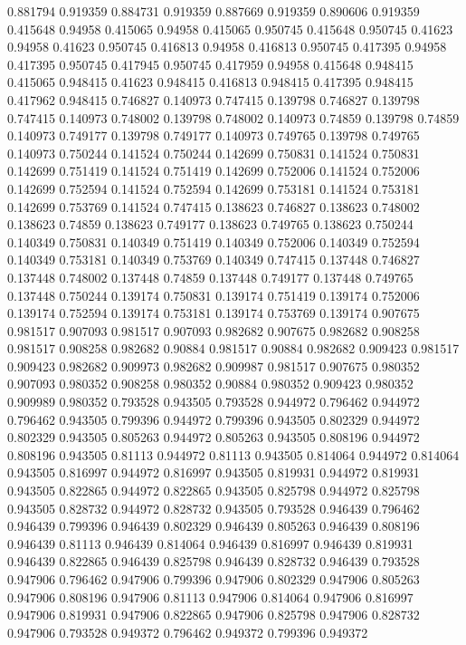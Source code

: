 0.881794 0.919359
0.884731 0.919359
0.887669 0.919359
0.890606 0.919359
0.415648 0.94958
0.415065 0.94958
0.415065 0.950745
0.415648 0.950745
0.41623 0.94958
0.41623 0.950745
0.416813 0.94958
0.416813 0.950745
0.417395 0.94958
0.417395 0.950745
0.417945 0.950745
0.417959 0.94958
0.415648 0.948415
0.415065 0.948415
0.41623 0.948415
0.416813 0.948415
0.417395 0.948415
0.417962 0.948415
0.746827 0.140973
0.747415 0.139798
0.746827 0.139798
0.747415 0.140973
0.748002 0.139798
0.748002 0.140973
0.74859 0.139798
0.74859 0.140973
0.749177 0.139798
0.749177 0.140973
0.749765 0.139798
0.749765 0.140973
0.750244 0.141524
0.750244 0.142699
0.750831 0.141524
0.750831 0.142699
0.751419 0.141524
0.751419 0.142699
0.752006 0.141524
0.752006 0.142699
0.752594 0.141524
0.752594 0.142699
0.753181 0.141524
0.753181 0.142699
0.753769 0.141524
0.747415 0.138623
0.746827 0.138623
0.748002 0.138623
0.74859 0.138623
0.749177 0.138623
0.749765 0.138623
0.750244 0.140349
0.750831 0.140349
0.751419 0.140349
0.752006 0.140349
0.752594 0.140349
0.753181 0.140349
0.753769 0.140349
0.747415 0.137448
0.746827 0.137448
0.748002 0.137448
0.74859 0.137448
0.749177 0.137448
0.749765 0.137448
0.750244 0.139174
0.750831 0.139174
0.751419 0.139174
0.752006 0.139174
0.752594 0.139174
0.753181 0.139174
0.753769 0.139174
0.907675 0.981517
0.907093 0.981517
0.907093 0.982682
0.907675 0.982682
0.908258 0.981517
0.908258 0.982682
0.90884 0.981517
0.90884 0.982682
0.909423 0.981517
0.909423 0.982682
0.909973 0.982682
0.909987 0.981517
0.907675 0.980352
0.907093 0.980352
0.908258 0.980352
0.90884 0.980352
0.909423 0.980352
0.909989 0.980352
0.793528 0.943505
0.793528 0.944972
0.796462 0.944972
0.796462 0.943505
0.799396 0.944972
0.799396 0.943505
0.802329 0.944972
0.802329 0.943505
0.805263 0.944972
0.805263 0.943505
0.808196 0.944972
0.808196 0.943505
0.81113 0.944972
0.81113 0.943505
0.814064 0.944972
0.814064 0.943505
0.816997 0.944972
0.816997 0.943505
0.819931 0.944972
0.819931 0.943505
0.822865 0.944972
0.822865 0.943505
0.825798 0.944972
0.825798 0.943505
0.828732 0.944972
0.828732 0.943505
0.793528 0.946439
0.796462 0.946439
0.799396 0.946439
0.802329 0.946439
0.805263 0.946439
0.808196 0.946439
0.81113 0.946439
0.814064 0.946439
0.816997 0.946439
0.819931 0.946439
0.822865 0.946439
0.825798 0.946439
0.828732 0.946439
0.793528 0.947906
0.796462 0.947906
0.799396 0.947906
0.802329 0.947906
0.805263 0.947906
0.808196 0.947906
0.81113 0.947906
0.814064 0.947906
0.816997 0.947906
0.819931 0.947906
0.822865 0.947906
0.825798 0.947906
0.828732 0.947906
0.793528 0.949372
0.796462 0.949372
0.799396 0.949372
